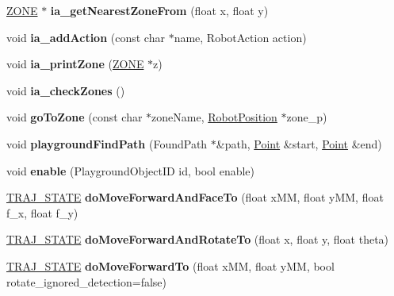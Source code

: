 \begin{DoxyCompactItemize}
\hyperlink{structZONE}{Z\+O\+NE} $\ast$ {\bfseries ia\+\_\+get\+Nearest\+Zone\+From} (float x, float y)
\item 
\mbox{\label{classIAbyPath_a8b7ee1e28ac3b80eb56aa484755f4676}} 
void {\bfseries ia\+\_\+add\+Action} (const char $\ast$name, Robot\+Action action)
\item 
\mbox{\label{classIAbyPath_ac0ec21dccd4242021490415071acd8e1}} 
void {\bfseries ia\+\_\+print\+Zone} (\hyperlink{structZONE}{Z\+O\+NE} $\ast$z)
\item 
\mbox{\label{classIAbyPath_a659be955d17b16795bd842079c9a154d}} 
void {\bfseries ia\+\_\+check\+Zones} ()
\item 
\mbox{\label{classIAbyPath_a27cb9230173b269f6492e8265d4b4a9c}} 
void {\bfseries go\+To\+Zone} (const char $\ast$zone\+Name, \hyperlink{structRobotPosition}{Robot\+Position} $\ast$zone\+\_\+p)
\item 
\mbox{\label{classIAbyPath_a44107ea221a5d20ae780247bc814203c}} 
void {\bfseries playground\+Find\+Path} (Found\+Path $\ast$\&path, \hyperlink{classVec2}{Point} \&start, \hyperlink{classVec2}{Point} \&end)
\item 
\mbox{\label{classIAbyPath_aac20ab04b45d22e8ceae82504416716e}} 
void {\bfseries enable} (Playground\+Object\+ID id, bool enable)
\item 
\mbox{\label{classIAbyPath_a4bf13457ddf9d6a51294ad620cb0b9bf}} 
\hyperlink{path__manager_8h_adb3360abeb29758da93865c8afcb80eb}{T\+R\+A\+J\+\_\+\+S\+T\+A\+TE} {\bfseries do\+Move\+Forward\+And\+Face\+To} (float x\+MM, float y\+MM, float f\+\_\+x, float f\+\_\+y)
\item 
\mbox{\label{classIAbyPath_a93df0ec9c67fa09403092b6d5926b582}} 
\hyperlink{path__manager_8h_adb3360abeb29758da93865c8afcb80eb}{T\+R\+A\+J\+\_\+\+S\+T\+A\+TE} {\bfseries do\+Move\+Forward\+And\+Rotate\+To} (float x, float y, float theta)
\item 
\mbox{\label{classIAbyPath_a1b41ff8776b67b268c9cfc2be5c70ac4}} 
\hyperlink{path__manager_8h_adb3360abeb29758da93865c8afcb80eb}{T\+R\+A\+J\+\_\+\+S\+T\+A\+TE} {\bfseries do\+Move\+Forward\+To} (float x\+MM, float y\+MM, bool rotate\+\_\+ignored\+\_\+detection=false)

\end{DoxyCompactItemize}

